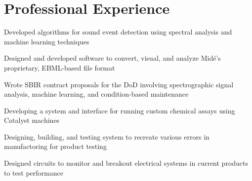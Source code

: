 \documentclass[letterpaper]{deedy-resume} %
\begin{document}
\begin{minipage}[t]{0.66\textwidth} %


\section{Professional Experience}


\vspace{\topsep} %
\begin{tightitemize}
\item Developed algorithms for sound event detection using spectral analysis and machine learning techniques
\item Designed and developed software to convert, visual, and analyze Midé's proprietary, EBML-based file format
\item Wrote SBIR contract proposals for the DoD involving spectrographic signal analysis, machine learning, and condition-based maintenance
\end{tightitemize}

\sectionspace %



\begin{tightitemize}
\item Developing a system and interface for running custom chemical assays using Catalyst machines
\item Designing, building, and testing system to recreate various errors in manufactoring for product testing
\item Designed circuits to monitor and breakout electrical systems in current products to test performance
\end{tightitemize}

\sectionspace %




\end{minipage}
\end{document}
